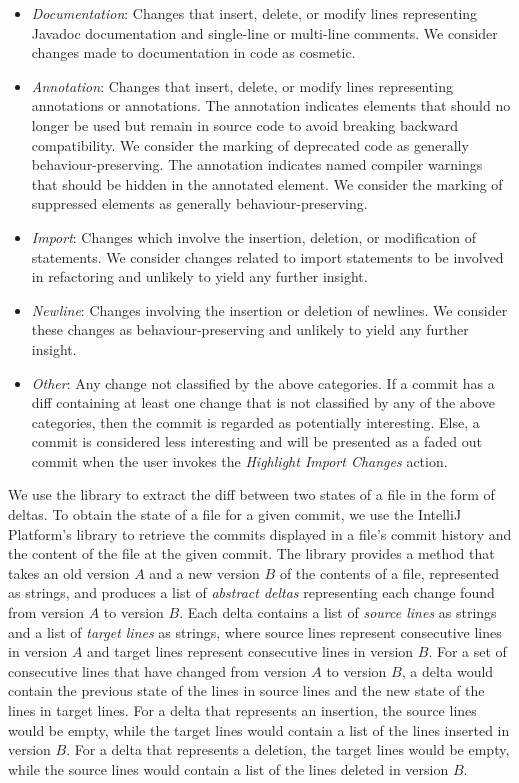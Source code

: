 \begin{itemize}
    \item \textit{Documentation}: Changes that insert, delete, or modify lines representing Javadoc documentation and single-line or multi-line comments. We consider changes made to documentation in code as cosmetic.
    \item \textit{Annotation}: \sloppy Changes that insert, delete, or modify lines representing  annotations or  annotations. The  annotation indicates elements that should no longer be used but remain in source code to avoid breaking backward compatibility. We consider the marking of deprecated code as generally behaviour-preserving. The  annotation indicates named compiler warnings that should be hidden in the annotated element. We consider the marking of  suppressed elements as generally behaviour-preserving.
    \item \textit{Import}: Changes which involve the insertion, deletion, or modification of  statements. We consider changes related to import statements to be involved in refactoring and unlikely to yield any further insight.
    \item \textit{Newline}: Changes involving the insertion or deletion of newlines. We consider these changes as behaviour-preserving and unlikely to yield any further insight.
    \item \textit{Other}: Any change not classified by the above categories. If a commit has a diff containing at least one change that is not classified by any of the above categories, then the commit is regarded as potentially interesting. Else, a commit is considered less interesting and will be presented as a faded out commit when the user invokes the \emph{Highlight Import Changes} action.
\end{itemize}

We use the  \cite{java-diff-utils} library to extract the diff between two states of a file in the form of deltas. 
To obtain the state of a file for a given commit, we use the IntelliJ Platform's  library to retrieve the commits displayed in a file's commit history and the content of the file at the given commit.
The  library provides a method that takes an old version $A$ and a new version $B$ of the contents of a file, represented as strings, and produces a list of \emph{abstract deltas} representing each change found from version $A$ to version $B$. 
Each delta contains a list of \emph{source lines} as strings and a list of \emph{target lines} as strings, where source lines represent consecutive lines in version $A$ and target lines represent consecutive lines in version $B$. 
For a set of consecutive lines that have changed from version $A$ to version $B$, a delta would contain the previous state of the lines in source lines and the new state of the lines in target lines.
For a delta that represents an insertion, the source lines would be empty, while the target lines would contain a list of the lines inserted in version $B$.
For a delta that represents a deletion, the target lines would be empty, while the source lines would contain a list of the lines deleted in version $B$.

